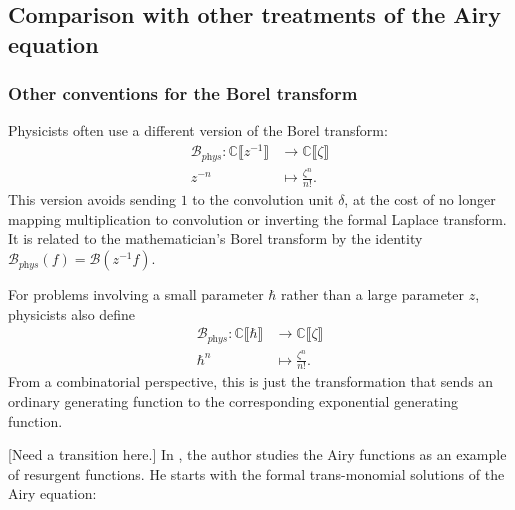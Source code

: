 \documentclass{article}
\newcommand{\maps}{\colon}
\newcommand{\C}{\mathbb{C}}
\newcommand{\borel}{\mathcal{B}}
\theoremstyle{definition}
\theoremstyle{plain}
\newenvironment{todo}{\color{Coral}}{\color{black}}
\begin{document}
\subsection{Comparison with other treatments of the Airy equation}\label{airy-comparison}
%
\subsubsection{Other conventions for the Borel transform}
%
Physicists often use a different version of the Borel transform:
\begin{align*}
\borel_{\textit{phys}} \maps \C \llbracket z^{-1} \rrbracket & \to \C \llbracket \zeta \rrbracket \\
z^{-n} & \mapsto \frac{\zeta^n}{n!}.
\end{align*}
This version avoids sending $1$ to the convolution unit $\delta$, at the cost of no longer mapping multiplication to convolution or inverting the formal Laplace transform. It is related to the mathematician's Borel transform by the identity $\borel_\textit{phys}(f) = \borel(z^{-1} f)$.

For problems involving a small parameter $\hbar$ rather than a large parameter $z$, physicists also define
\begin{align*}
\borel_{\textit{phys}} \maps \C \llbracket \hbar \rrbracket & \to \C \llbracket \zeta \rrbracket \\
\hbar^n & \mapsto \frac{\zeta^n}{n!}.
\end{align*}
From a combinatorial perspective, this is just the transformation that sends an ordinary generating function to the corresponding exponential generating function.

\begin{todo}[Need a transition here.]\end{todo} In \cite{lectures-Marino}, the author studies the Airy functions as an example of resurgent functions. He starts with the formal trans-monomial solutions of the Airy equation:
\end{document}
